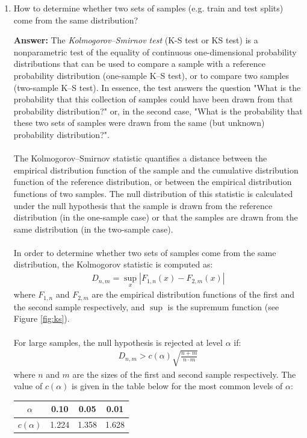 \documentclass{article}
\newenvironment{QandA}{\begin{enumerate}[label=\arabic*.]}{\end{enumerate}}
\newenvironment{answer}{\par\normalfont \textbf{Answer:}}{}
\begin{document}
\begin{QandA}
    \item How to determine whether two sets of samples (e.g. train and test splits) come from the same distribution?
    \begin{answer}
        The \textit{Kolmogorov–Smirnov test} (K-S test or KS test) is a nonparametric test of the equality of continuous one-dimensional probability distributions that can be used to compare a sample with a reference probability distribution (one-sample K–S test), or to compare two samples (two-sample K–S test). In essence, the test answers the question "What is the probability that this collection of samples could have been drawn from that probability distribution?" or, in the second case, "What is the probability that these two sets of samples were drawn from the same (but unknown) probability distribution?". \\\\
        The Kolmogorov–Smirnov statistic quantifies a distance between the empirical distribution function of the sample and the cumulative distribution function of the reference distribution, or between the empirical distribution functions of two samples. The null distribution of this statistic is calculated under the null hypothesis that the sample is drawn from the reference distribution (in the one-sample case) or that the samples are drawn from the same distribution (in the two-sample case). \\\\
        In order to determine whether two sets of samples come from the same distribution, the Kolmogorov statistic is computed as:
        \begin{align*}
            D_{n, m} = \sup_x \left \vert F_{1,n}(x) - F_{2, m}(x)  \right \vert
        \end{align*}
        where $F_{1, n}$ and $F_{2, m}$ are the empirical distribution functions of the first and the second sample respectively, and $\sup$ is the supremum function (see Figure \ref{fig:ks}).\\\\
        For large samples, the null hypothesis is rejected at level $\alpha$ if:
        \begin{align*}
            D_{n, m} > c(\alpha) \sqrt{\frac{n + m}{n \cdot m}}
        \end{align*}
        where $n$ and $m$ are the sizes of the first and second sample respectively. The value of $c(\alpha)$ is given in the table below for the most common levels of $\alpha$:
        \begin{table}[htb!]
        \centering
        \begin{tabular}{|c|c|c|c|}
        \hline
        \textbf{$\alpha$}    & 0.10  & 0.05  & 0.01  \\ \hline
        \textbf{$c(\alpha)$} & 1.224 & 1.358 & 1.628 \\ \hline
        \end{tabular}
        \end{table}


\end{answer}
\end{QandA}
\end{document}
